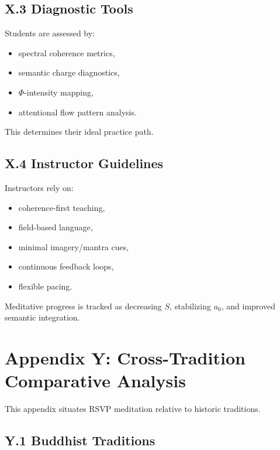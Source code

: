\documentclass[12pt]{article}
\begin{document}
\subsection*{X.3 Diagnostic Tools}

Students are assessed by:

\begin{itemize}
\item spectral coherence metrics,
\item semantic charge diagnostics,
\item $\Phi$-intensity mapping,
\item attentional flow pattern analysis.
\end{itemize}

This determines their ideal practice path.

\subsection*{X.4 Instructor Guidelines}

Instructors rely on:

\begin{itemize}
\item coherence-first teaching,
\item field-based language,
\item minimal imagery/mantra cues,
\item continuous feedback loops,
\item flexible pacing.
\end{itemize}

Meditative progress is tracked as decreasing $S$, stabilizing $a_0$, and improved
semantic integration.


\section*{Appendix Y: Cross-Tradition Comparative Analysis}

This appendix situates RSVP meditation relative to historic traditions.

\subsection*{Y.1 Buddhist Traditions}
\end{document}
